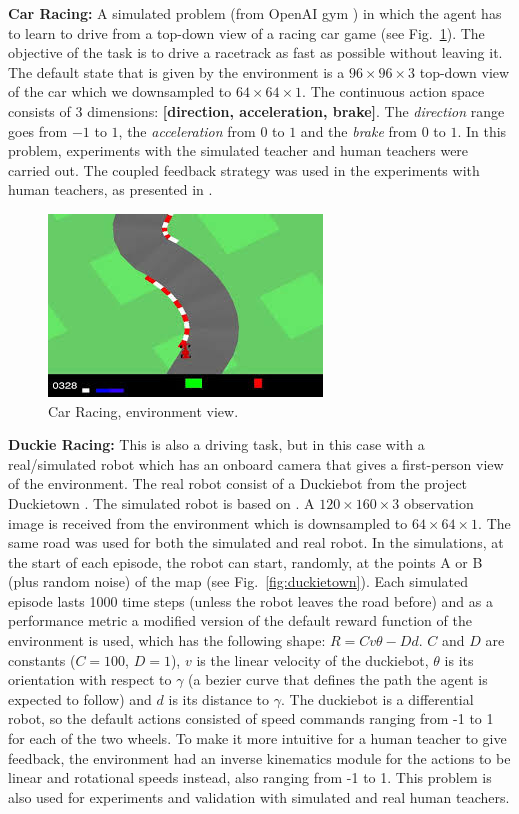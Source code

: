 \textbf{Car Racing:} A simulated problem (from OpenAI gym \cite{brockman2016openai}) in which the agent has to learn to drive from a top-down view of a racing car game (see Fig.~\ref{fig:Car_Racing}). The objective of the task is to drive a racetrack as fast as possible without leaving it. The default state that is given by the environment is a $96\times96\times3$ top-down view of the car which we downsampled to $64\times64\times1$. The continuous action space consists of 3 dimensions: \textbf{[direction, acceleration, brake]}. The \emph{direction} range goes from $-1$ to $1$, the \emph{acceleration} from $0$ to $1$ and the \emph{brake} from $0$ to $1$. In this problem, experiments with the simulated teacher and human teachers were carried out. The coupled feedback strategy was used in the experiments with human teachers, as presented in \cite{perez2018interactive}.

\begin{figure}[h]
    \centering
    \includegraphics[scale=0.8]{imagenes/cap3/car_racing_env.jpg}
    \caption{Car Racing, environment view.}
    \label{fig:Car_Racing}
\end{figure}
    
\textbf{Duckie Racing:} This is also a driving task, but in this case with a real/simulated robot which has an onboard camera that gives a first-person view of the environment. The real robot consist of a Duckiebot from the project Duckietown \cite{Paull2017}. The simulated robot is based on \cite{gym_duckietown}. A $120\times160\times3$ observation image is received from the environment which is downsampled to $64\times64\times1$. The same road was used for both the simulated and real robot. In the simulations, at the start of each episode, the robot can start, randomly, at the points A or B (plus random noise) of the map (see Fig.~\ref{fig:duckietown}). Each simulated episode lasts 1000 time steps (unless the robot leaves the road before) and as a performance metric a modified version of the default reward function of the environment is used, which has the following shape: $R = Cv\theta - Dd$. $C$ and $D$ are constants ($C=100$, $D=1$), $v$ is the linear velocity of the duckiebot, $\theta$ is its orientation with respect to $\gamma$ (a bezier curve that defines the path the agent is expected to follow) and $d$ is its distance to $\gamma$. The duckiebot is a differential robot, so the default actions consisted of speed commands ranging from -1 to 1 for each of the two wheels. To make it more intuitive for a human teacher to give feedback, the environment had an inverse kinematics module for the actions to be linear and rotational speeds instead, also ranging from -1 to 1. This problem is also used for experiments and validation with simulated and real human teachers.

